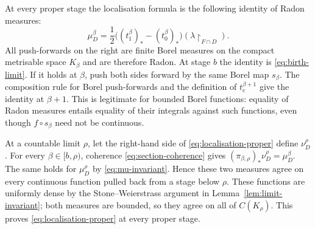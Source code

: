 \documentclass[a4paper,11pt]{amsart}
\theoremstyle{plain}
\theoremstyle{definition}
\theoremstyle{remark}
\newcommand{\restr}[1]{{\restriction_{#1}}}
\numberwithin{equation}{section}
\begin{document}
At every proper stage the localisation formula is the following identity of Radon measures:
\begin{equation}\label{eq:localisation-proper}
 \mu_D^\beta=
 \frac12\bigl((t_1^\beta)_*-(t_0^\beta)_*\bigr)
 (\lambda\restr{F\cap D}).
\end{equation}
All push-forwards on the right are finite Borel measures on the compact metrisable space $K_\beta$ and are therefore Radon.  At stage $b$ the identity is \eqref{eq:birth-limit}.  If it holds at $\beta$, push both sides forward by the same Borel map $s_\beta$.  The composition rule for Borel push-forwards and the definition of $t_e^{\beta+1}$ give the identity at $\beta+1$.  This is legitimate for bounded Borel functions: equality of Radon measures entails equality of their integrals against such functions, even though $f\circ s_\beta$ need not be continuous.

At a countable limit $\rho$, let the right-hand side of \eqref{eq:localisation-proper} define $\nu_D^\rho$.  For every $\beta\in[b,\rho)$, coherence \eqref{eq:section-coherence} gives
$(\pi_{\beta,\rho})_*\nu_D^\rho=\mu_D^\beta$.
The same holds for $\mu_D^\rho$ by \eqref{eq:mu-invariant}.  Hence these two measures agree on every continuous function pulled back from a stage below $\rho$.  These functions are uniformly dense by the Stone--Weierstrass argument in Lemma~\ref{lem:limit-invariant}; both measures are bounded, so they agree on all of $C(K_\rho)$.  This proves \eqref{eq:localisation-proper} at every proper stage.
\end{document}
